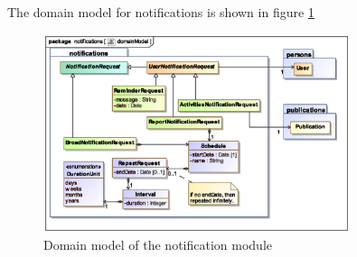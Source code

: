 The domain model for notifications is shown in figure \ref{fig:notifications_domainModel} 

\begin{figure}[htb]
\begin{center}
  \includegraphics[width=0.8\textwidth,height=0.4\textheight,keepaspectratio=true]{domainModel}
\end{center}
\caption{ Domain model of the notification module \label{fig:notifications_domainModel}}
\end{figure}
 
